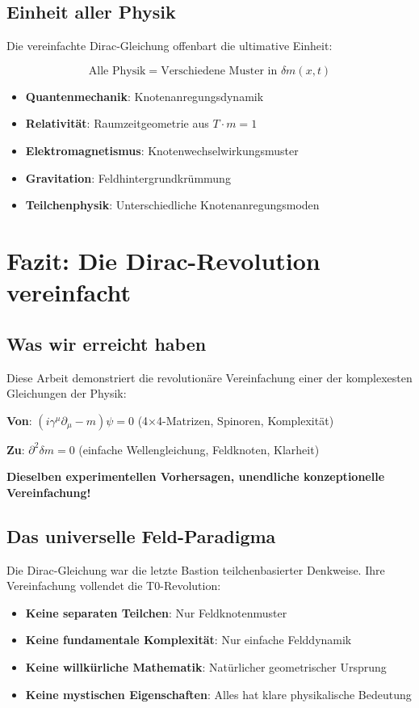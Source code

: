 \documentclass[12pt,a4paper]{article}
\newcommand{\deltam}{\delta m}
\theoremstyle{definition}
\theoremstyle{remark}
\begin{document}
	\subsection{Einheit aller Physik}
	
	Die vereinfachte Dirac-Gleichung offenbart die ultimative Einheit:
	
	\begin{equation}
		\text{Alle Physik} = \text{Verschiedene Muster in } \deltam(x,t)
	\end{equation}
	
	\begin{itemize}
		\item \textbf{Quantenmechanik}: Knotenanregungsdynamik
		\item \textbf{Relativität}: Raumzeitgeometrie aus $T \cdot m = 1$
		\item \textbf{Elektromagnetismus}: Knotenwechselwirkungsmuster
		\item \textbf{Gravitation}: Feldhintergrundkrümmung
		\item \textbf{Teilchenphysik}: Unterschiedliche Knotenanregungsmoden
	\end{itemize}
	
	\section{Fazit: Die Dirac-Revolution vereinfacht}
	
	\subsection{Was wir erreicht haben}
	
	Diese Arbeit demonstriert die revolutionäre Vereinfachung einer der komplexesten Gleichungen der Physik:
	
	\begin{center}
		\textbf{Von}: $(i\gamma^{\mu}\partial_{\mu} - m)\psi = 0$ (4×4-Matrizen, Spinoren, Komplexität)
		
		\textbf{Zu}: $\partial^2 \deltam = 0$ (einfache Wellengleichung, Feldknoten, Klarheit)
	\end{center}
	
	\textbf{Dieselben experimentellen Vorhersagen, unendliche konzeptionelle Vereinfachung!}
	
	\subsection{Das universelle Feld-Paradigma}
	
	Die Dirac-Gleichung war die letzte Bastion teilchenbasierter Denkweise. Ihre Vereinfachung vollendet die T0-Revolution:
	
	\begin{itemize}
		\item \textbf{Keine separaten Teilchen}: Nur Feldknotenmuster
		\item \textbf{Keine fundamentale Komplexität}: Nur einfache Felddynamik
		\item \textbf{Keine willkürliche Mathematik}: Natürlicher geometrischer Ursprung
		\item \textbf{Keine mystischen Eigenschaften}: Alles hat klare physikalische Bedeutung
	\end{itemize}
	
\end{document}
